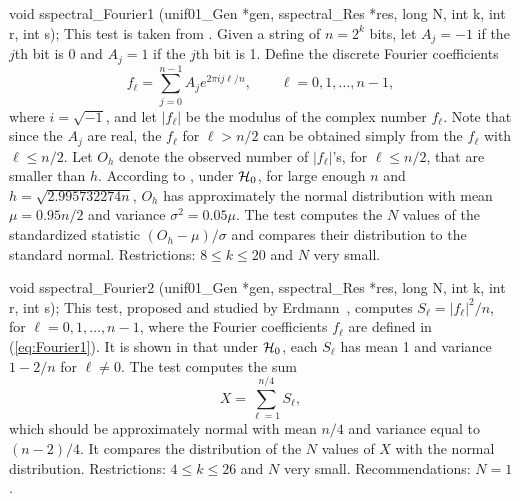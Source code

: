 void sspectral_Fourier1 (unif01_Gen *gen, sspectral_Res *res,
                         long N, int k, int r, int s);
\endcode
\tab
   This test is taken from \cite{rRUK01a}. %
   Given a string of $n= 2^k$ bits, let $A_j = -1$ if the $j${th} bit
   is 0 and $A_j = 1$ if the $j$th bit is 1.
   Define the discrete Fourier coefficients
\begin{equation}
   f_\ell = \sum_{j=0}^{n-1} A_j e^{2\pi i j\ell/n},\qquad
    \ell = 0, 1, \ldots,n-1, \label{eq:Fourier1}
\end{equation}
   where $i = \sqrt{-1}$, and let $|f_\ell|$ be the modulus of the
   complex number $f_\ell$.
   Note that since the $A_j$ are real,
   the $f_\ell$ for $\ell > n/2$ can be obtained
   simply from the $f_\ell$ with $\ell \le n/2$.
   Let $O_h$ denote the observed number of $|f_\ell|$'s, for $\ell \le n/2$,
   that are smaller than $h$.
   According to \cite{rRUK01a}, under $\mathcal{H}_0$, for large enough
   $n$ and $h = \sqrt{2.995732274n}$, $O_h$ has approximately the
   normal distribution with mean $\mu = 0.95 n/2$ and variance
   $\sigma^2 = 0.05 \mu$.
   The test computes the $N$ values of the standardized statistic
   $(O_h - \mu)/\sigma$ and compares their distribution to the standard
   normal.
  Restrictions: $8 \le k \le 20$ and $N$ very small.
\endtab
\code


void sspectral_Fourier2 (unif01_Gen *gen, sspectral_Res *res,
                         long N, int k, int r, int s);
\endcode
\tab
  This test, proposed and studied by Erdmann~\cite{rERD92a},
  computes $S_\ell = |f_\ell|^2/n$,  %
  for $\ell = 0, 1, \ldots,n-1$, where the Fourier coefficients
  $f_\ell$ are defined in (\ref{eq:Fourier1}).
  It is shown in \cite{rERD92a} that under $\mathcal{H}_0$,
  each $S_\ell$ has mean 1 and variance $1 -  2 /n$ for $ \ell \not= 0$.
  The test computes the sum 
 $$
  X = \sum_{\ell= 1}^{n/4} S_\ell,
$$
  which should be approximately normal
with mean $n/4$ and variance equal to $(n-2)/4$.
  It compares the distribution of the $N$ values of $X$
  with the normal distribution.
  Restrictions: $4 \le k \le 26$ and $N$ very small.
  Recommendations: $N=1$.
\endtab
\code


